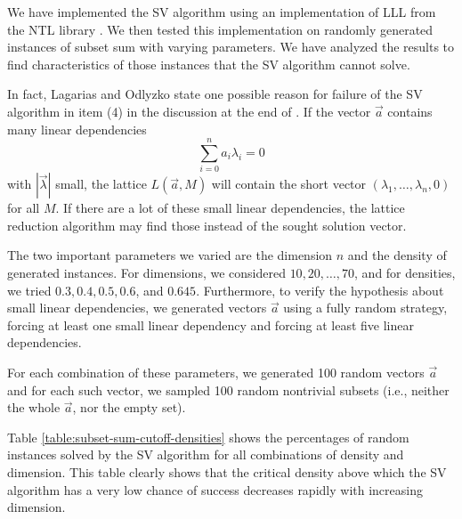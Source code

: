 We have implemented the SV algorithm using an implementation of LLL from
the NTL library \cite{ntl}. We then tested this implementation on randomly
generated instances of subset sum with varying parameters. We have
analyzed the results to find characteristics of those instances that the
SV algorithm cannot solve.

In fact, Lagarias and Odlyzko state one possible reason for failure of the
SV algorithm in item (4) in the discussion at the end of 
\cite{lagarias-odlyzko}. If the vector $\vec{a}$ contains many linear
dependencies
$$
    \sum_{i=0}^n a_i \lambda_i = 0
$$
with $|\vec{\lambda}|$ small, the lattice $L(\vec{a}, M)$ will contain the
short vector $(\lambda_1,\allowbreak \dots,\allowbreak
\lambda_n, 0)$ for all $M$. If there are a lot of these small
linear dependencies, the lattice reduction algorithm may find those
instead of the sought solution vector.

The two important parameters we varied are the dimension $n$ and the
density of generated instances. For dimensions, we considered $10, 20,
\dots, 70$, and for densities, we tried $0.3, 0.4, 0.5, 0.6$, and $0.645$.
Furthermore, to verify the hypothesis about small linear dependencies, we
generated vectors $\vec{a}$ using a fully random strategy, forcing at
least one small linear dependency and forcing at least five linear
dependencies.

For each combination of these parameters, we generated 100 random vectors
$\vec{a}$ and for each such vector, we sampled 100 random nontrivial
subsets (i.e., neither the whole $\vec{a}$, nor the empty set).

Table \ref{table:subset-sum-cutoff-densities} shows the percentages of
random instances solved by the SV algorithm for all combinations of
density and dimension. This table clearly shows that the critical density
above which the SV algorithm has a very low chance of success decreases
rapidly with increasing dimension.

